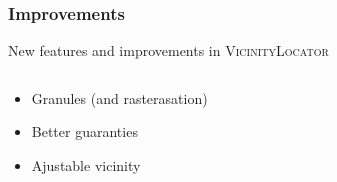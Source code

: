 \begin{frame}[red] %
\frametitle{Improvements}

New features and improvements in \textsc{VicinityLocator}
\begin{columns}
\begin{column}{0.5\textwidth}
\begin{itemize}
	\item Granules (and rasterasation) 
	\item Better guaranties
	\item Ajustable vicinity
\end{itemize}
\vspace{5cm}
\end{column}
\begin{column}{0.5\textwidth}
\end{column}
\end{columns}
\end{frame}



